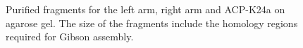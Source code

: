 		\setlength\fboxsep{5pt}
		\setlength\fboxrule{1.5pt}
		\begin{figure}[htbp]
		\centering
		\caption[Purified fragments for the left arm, right arm and ACP-K24a on agarose gel.]{Purified fragments for the left arm, right arm and ACP-K24a on agarose gel. The size of the fragments include the homology regions required for Gibson assembly.}
		\label{fig:threefragments}
		\end{figure}
	
